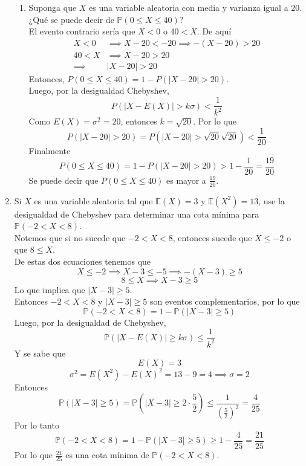 \documentclass[12pt,a4paper]{report}
\begin{document}
\begin{enumerate}
{\begin{enumerate}
				\item {
					Suponga que $X$ es una variable aleatoria con media y
					varianza igual a 20. ¿Qué se puede decir de
					$\mathbb{P}(0 \leq X \leq 40)$?\\
					El evento contrario sería que $X < 0$ o $40 < X$. De aquí
					\begin{align*}
						X < 0 &\implies X - 20 < -20 \implies -(X-20) > 20\\
						40 < X &\implies X - 20 > 20\\
						\implies &|X-20|>20
					\end{align*}
					Entonces, $P(0 \leq X \leq 40) = 1 - P(|X-20|>20)$.\\
					Luego, por la desigualdad Chebyshev,
					\[P(|X-E(X)| > k\sigma) < \frac{1}{k^2}\]
					Como $E(X) = \sigma ^2 = 20$, entonces $k=\sqrt{20}$.
					Por lo que
					\[P(|X-20| > 20)  = P(|X-20| > \sqrt{20}\sqrt{20}) <
					\frac{1}{20}\]
					Finalmente
					\[P(0 \leq X \leq 40) = 1 - P(|X-20| > 20)
					> 1 - \frac{1}{20} = \frac{19}{20}\]
					Se puede decir que $P(0 \leq X \leq 40)$ es mayor a
					$\frac{19}{20}$.
				}
			\end{enumerate}
		}

		\item{
			Si $X$ es una variable aleatoria tal que $\mathbb{E}(X) = 3$ y
			$\mathbb{E}(X^2) = 13$, use la desigualdad de Chebyshev para
			determinar una cota mínima para $\mathbb{P}(-2 < X < 8)$.\\
			Notemos que si no sucede que $-2 < X < 8$, entonces  sucede que
					$X \leq -2$ o que $8 \leq X$.\\
					De estas dos ecuaciones tenemos que
					\[X \leq -2 \implies X - 3 \leq -5 \implies -(X - 3) \geq 5\]
					\[ 8 \leq X \implies X - 3 \geq 5\]
					Lo que implica que $|X-3| \geq 5$.\\
					Entonces $-2 < X < 8$ y $|X-3| \geq 5$ son eventos
					complementarios, por lo que
					\[\mathbb{P}(-2 < X < 8) = 1 - \mathbb{P}(|X-3| \geq 5)\]
					Luego, por la desigualdad de Chebyshev,
					\[\mathbb{P}(|X-E(X)| \geq k\sigma) \leq \frac{1}{k^2}\]
					Y se sabe que
					\[E(X) = 3\]
					\[\sigma ^2 = E(X^2) - E(X)^2 = 13 - 9 = 4 \implies \sigma = 2\]
					Entonces
					\[\mathbb{P}(|X-3| \geq 5) = \mathbb{P}(|X-3| \geq 2\cdot \frac{5}{2})
					 \leq \frac{1}{(\frac{5}{2})^2} = \frac{4}{25}\]
					Por lo tanto
					\[\mathbb{P}(-2 < X < 8) = 1 - \mathbb{P}(|X-3| \geq 5)
					\geq 1 - \frac{4}{25} = \frac{21}{25}\]
					Por lo que $\frac{21}{25}$ es una cota mínima de
					$\mathbb{P}(-2 < X < 8)$.
		}


\end{enumerate}
\end{document}
